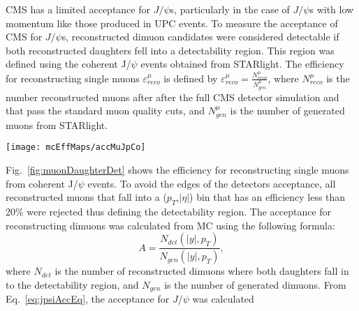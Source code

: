        CMS has a limited acceptance for $J/\psi$s, particularly in the case of 
        $J/\psi$s with low momentum like those produced in UPC events. 
      To measure the acceptance of CMS for $J/\psi$s, reconstructed dimuon 
        candidates were considered detectable if both reconstructed daughters 
        fell into a detectability region.
      This region was defined using the coherent J/$\psi$ events obtained from 
        STARlight.
      The efficiency for reconstructing single muons $\varepsilon^{\mu}_{reco}$ 
        is defined by $\varepsilon^{\mu}_{reco} = \frac{N^{\mu}_{reco}}{N^{\mu}_{gen}}$, 
        where $N^{\mu}_{reco}$ is the number reconstructed muons after 
        after the full CMS detector simulation and that pass the standard
        muon quality cuts, and $N^{\mu}_{gen}$ is the number of generated 
        muons from STARlight.
      \begin{figure*}[!Hhtb]
        \centering
          \texttt{[image: mcEffMaps/accMuJpCo]} %
        \caption{ Muon daughter detectability from coherent J/$\psi$, 
          incoherent J/$\psi$, photon-photon, and J/$\psi$ gun samples.}
        \label{fig:muonDaughterDet}
      \end{figure*}
      Fig.~\ref{fig:muonDaughterDet} shows the efficiency for reconstructing
        single muons from coherent J/$\psi$ events.
      To avoid the edges of the detectors acceptance, all reconstructed muons 
        that fall into a ($p_{T}$,$|\eta|$) bin that has an efficiency less 
        than 20\% were rejected thus defining the detectability region.
      The acceptance for reconstructing dimuons was calculated from MC
        using the following formula:
      \begin{equation}
        A=\frac{N_{det}(|y|,p_{T})}{N_{gen}(|y|,p_{T})},
        \label{eq:jpsiAccEq}
      \end{equation}
        where $N_{det}$ is the number of reconstructed dimuons where both 
        daughters fall in to the detectability region, and $N_{gen}$ is the
        number of generated dimuons. 
      From Eq.~\ref{eq:jpsiAccEq}, the acceptance for $J/\psi$ was calculated
